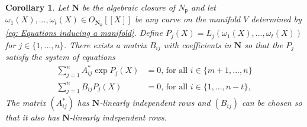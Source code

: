 \documentclass{article}
\newtheorem{corollary}{Corollary}[section]
\newcommand{\mfrak}[1]{\mathfrak{#1}}
\numberwithin{equation}{section}
\begin{document}
\begin{corollary}\label{cor: Any curve on V gives a solution to a system of equations}
    Let $\bm N$ be the algebraic closure of $N_{\mfrak p}$ and let $\omega_1(X), ..., \omega_t(X) \in O_{\bm {N_{\mfrak p}}}[[X]]$ be any curve on the manifold $V$ determined by \cref{eq: Equations inducing a manifold}. Define $P_j(X) = L_j(\omega_1(X), ..., \omega_t(X))$ for $j \in \{1, ..., n\}$. There exists a matrix $B_{ij}$ with coefficients in $\bm N$ so that the $P_j$ satisfy the system of equations
    \begin{equation}\label{eq: System that can also be solved}
        \begin{aligned}
            \sum_{j=1}^n A^*_{ij}\exp P_j(X) & = 0 \text{, for all } i \in \{ m+1, ..., n \} \\
            \sum_{j=1}^n B_{ij}P_j(X)        & = 0 \text{, for all } i \in \{1,  ..., n-t\},
        \end{aligned}
    \end{equation}
    The matrix $(A^*_{ij})$ has $\bm N$-linearly independent rows and $(B_{ij})$ can be chosen so that it also has $\bm N$-linearly independent rows.
\end{corollary}
\end{document}
